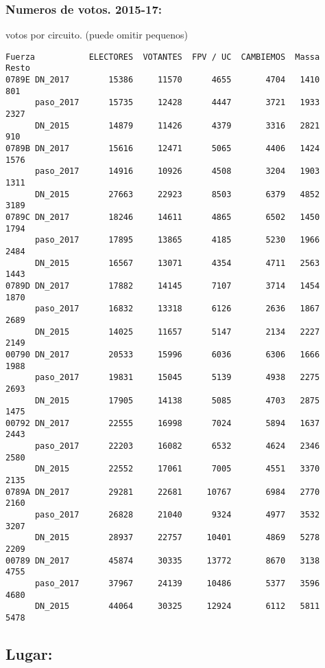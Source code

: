 \documentclass[11pt]{article}
\begin{document}
    \hypertarget{numeros-de-votos.-2015-17}{%
\subsubsection{Numeros de votos.
2015-17:}\label{numeros-de-votos.-2015-17}}

    
    votos por circuito. (puede omitir pequenos)

    
    
    \begin{verbatim}
Fuerza           ELECTORES  VOTANTES  FPV / UC  CAMBIEMOS  Massa  Resto
0789E DN_2017        15386     11570      4655       4704   1410    801
      paso_2017      15735     12428      4447       3721   1933   2327
      DN_2015        14879     11426      4379       3316   2821    910
0789B DN_2017        15616     12471      5065       4406   1424   1576
      paso_2017      14916     10926      4508       3204   1903   1311
      DN_2015        27663     22923      8503       6379   4852   3189
0789C DN_2017        18246     14611      4865       6502   1450   1794
      paso_2017      17895     13865      4185       5230   1966   2484
      DN_2015        16567     13071      4354       4711   2563   1443
0789D DN_2017        17882     14145      7107       3714   1454   1870
      paso_2017      16832     13318      6126       2636   1867   2689
      DN_2015        14025     11657      5147       2134   2227   2149
00790 DN_2017        20533     15996      6036       6306   1666   1988
      paso_2017      19831     15045      5139       4938   2275   2693
      DN_2015        17905     14138      5085       4703   2875   1475
00792 DN_2017        22555     16998      7024       5894   1637   2443
      paso_2017      22203     16082      6532       4624   2346   2580
      DN_2015        22552     17061      7005       4551   3370   2135
0789A DN_2017        29281     22681     10767       6984   2770   2160
      paso_2017      26828     21040      9324       4977   3532   3207
      DN_2015        28937     22757     10401       4869   5278   2209
00789 DN_2017        45874     30335     13772       8670   3138   4755
      paso_2017      37967     24139     10486       5377   3596   4680
      DN_2015        44064     30325     12924       6112   5811   5478
    \end{verbatim}

    
    \hypertarget{lugar}{%
\subsection{Lugar:}\label{lugar}}
\end{document}
